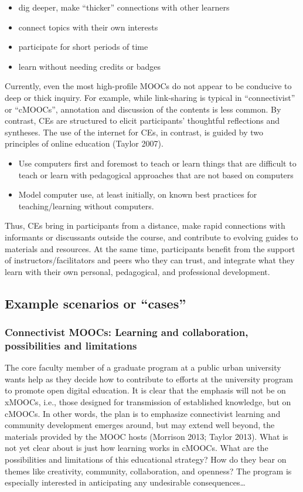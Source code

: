 \begin{itemize}
\item
  dig deeper, make ``thicker'' connections with other learners
\item
  connect topics with their own interests
\item
  participate for short periods of time
\item
  learn without needing credits or badges
\end{itemize}
Currently, even the most high-profile MOOCs do not appear to be
conducive to deep or thick inquiry. For example, while link-sharing is
typical in ``connectivist'' or ``cMOOCs'', annotation and discussion of
the contents is less common. By contrast, CEs are structured to elicit
participants' thoughtful reflections and syntheses. The use of the
internet for CEs, in contrast, is guided by two principles of online
education (Taylor 2007).

\begin{itemize}
\item
  Use computers first and foremost to teach or learn things that are
  difficult to teach or learn with pedagogical approaches that are not
  based on computers
\item
  Model computer use, at least initially, on known best practices for
  teaching/learning without computers.
\end{itemize}
Thus, CEs bring in participants from a distance, make rapid connections
with informants or discussants outside the course, and contribute to
evolving guides to materials and resources. At the same time,
participants benefit from the support of instructors/facilitators and
peers who they can trust, and integrate what they learn with their own
personal, pedagogical, and professional development.

\subsection{Example scenarios or ``cases''}

\subsubsection{Connectivist MOOCs: Learning and collaboration,
possibilities and limitations}

The core faculty member of a graduate program at a public urban
university wants help as they decide how to contribute to efforts at the
university program to promote open digital education. It is clear that
the emphasis will not be on xMOOCs, i.e., those designed for
transmission of established knowledge, but on cMOOCs. In other words,
the plan is to emphasize connectivist learning and community development
emerges around, but may extend well beyond, the materials provided by
the MOOC hosts (Morrison 2013; Taylor 2013). What is not yet clear about
is just how learning works in cMOOCs. What are the possibilities and
limitations of this educational strategy? How do they bear on themes
like creativity, community, collaboration, and openness? The program is
especially interested in anticipating any undesirable
consequences\ldots{}

